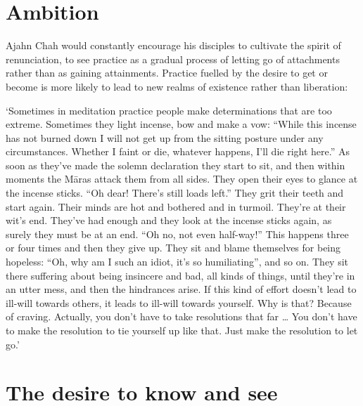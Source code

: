 \section{Ambition}

Ajahn Chah would constantly encourage his disciples to cultivate the
spirit of renunciation, to see practice as a gradual process of letting
go of attachments rather than as gaining attainments. Practice
fuelled by the desire to get or become is more likely to lead to new
realms of existence rather than liberation: 

`Sometimes in meditation practice people make determinations that are
too extreme. Sometimes they light incense, bow and make a vow: ``While
this incense has not burned down I will not get up from the sitting
posture under any circumstances. Whether I faint or die, whatever
happens, I'll die right here.'' As soon as they've made the solemn
declaration they start to sit, and then within moments the Māras attack
them from all sides. They open their eyes to glance at the incense
sticks. ``Oh dear! There's still loads left.'' They grit their teeth and
start again. Their minds are hot and bothered and in turmoil. They're at
their wit's end. They've had enough and they look at the incense sticks
again, as surely they must be at an end. ``Oh no, not even half-way!''
This happens three or four times and then they give up. They sit and
blame themselves for being hopeless: ``Oh, why am I such an idiot, it's
so humiliating'', and so on. They sit there suffering about being
insincere and bad, all kinds of things, until they're in an utter mess, 
and then the hindrances arise. If this kind of effort doesn't lead to
ill-will towards others, it leads to ill-will towards yourself. Why is
that? Because of craving. Actually, you don't have to take resolutions
that far \ldots{} You don't have to make the resolution to tie yourself
up like that. Just make the resolution to let go.'

\section{The desire to know and see}

